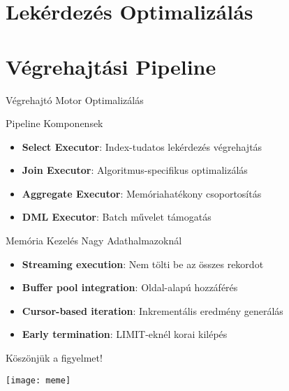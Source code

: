 \documentclass[aspectratio=169]{beamer}
\begin{document}
\section{Lekérdezés Optimalizálás}

\section{Végrehajtási Pipeline}

\begin{frame}{Végrehajtó Motor Optimalizálás}
\begin{block}{Pipeline Komponensek}
\begin{itemize}
    \item \textbf{Select Executor}: Index-tudatos lekérdezés végrehajtás
    \item \textbf{Join Executor}: Algoritmus-specifikus optimalizálás
    \item \textbf{Aggregate Executor}: Memóriahatékony csoportosítás
    \item \textbf{DML Executor}: Batch művelet támogatás
\end{itemize}
\end{block}

\begin{block}{Memória Kezelés Nagy Adathalmazoknál}
\begin{itemize}
    \item \textbf{Streaming execution}: Nem tölti be az összes rekordot
    \item \textbf{Buffer pool integration}: Oldal-alapú hozzáférés
    \item \textbf{Cursor-based iteration}: Inkrementális eredmény generálás
    \item \textbf{Early termination}: LIMIT-eknél korai kilépés
\end{itemize}
\end{block}
\end{frame}

\begin{frame}[c]
\begin{center}
{\Huge Köszönjük a figyelmet!}

\vspace{0.5cm}

\texttt{[image: meme]} 
\end{center}
\end{frame}
\end{document}

